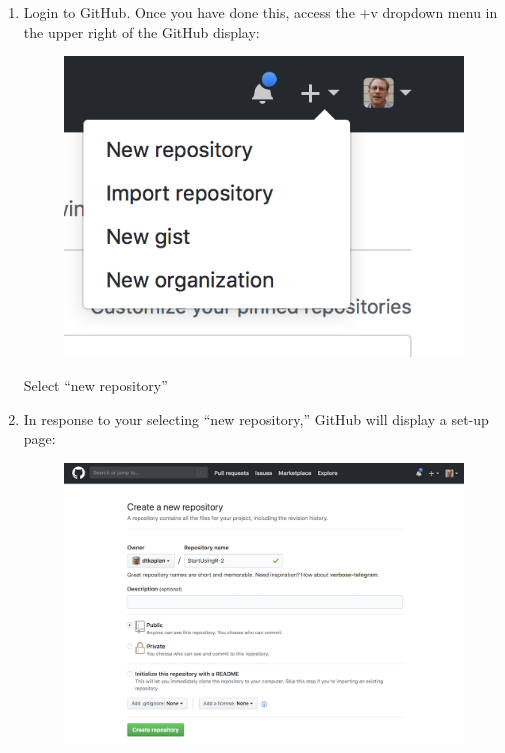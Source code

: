 \documentclass[]{book}
\theoremstyle{definition}
\theoremstyle{definition}
\theoremstyle{definition}
\theoremstyle{remark}
\begin{document}
\begin{enumerate}
\def\labelenumi{\arabic{enumi}.}
\item
  Login to GitHub. Once you have done this, access the +v dropdown menu
  in the upper right of the GitHub display:

  \begin{figure}
  \centering
  \includegraphics{images/new_repo1.png}
  \caption{}
  \end{figure}

  Select ``new repository''
\item
  In response to your selecting ``new repository,'' GitHub will display
  a set-up page:

  \begin{figure}
  \centering
  \includegraphics{images/new_repo2.png}
  \caption{}
  \end{figure}


\end{enumerate}
\end{document}
